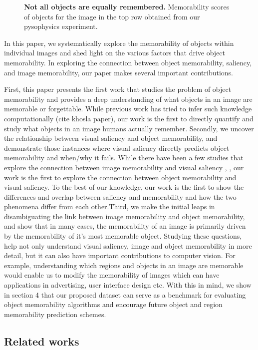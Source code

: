 \begin{figure}[t]
\centering
{}
\vspace{-5mm}\caption{\footnotesize\textbf{Not all objects are equally remembered.} Memorability scores of objects for the image in the top row obtained from our pysophysics experiment. }\label{fig:introPhoto}
\end{figure}

In this paper, we systematically explore the memorability of objects within individual images and shed light on the various factors that drive object memorability. In exploring the connection between object memorability, saliency, and image memorability, our paper makes several important contributions.

First, this paper presents the first work that studies the problem of object memorability and provides a deep understanding of what objects in an image are memorable or forgettable. While previous work has tried to infer such knowledge  computationally (cite khosla paper), our work is the first to directly quantify and study what objects in an image humans actually remember.  Secondly, we uncover the relationship between visual saliency and object memorability, and demonstrate those instances where visual saliency directly predicts object memorability and when/why it fails. While there have been a few studies that explore the connection between image memorability and visual saliency \cite{zoya15}, \cite{lemeur13}, our work is the first to explore the connection between object memorability and visual saliency. To the best of our knowledge, our work is the first to show the differences and overlap between saliency and memorability and how the two phenomena differ from each other.Third, we make the initial leaps in disambiguating the link between image memorability and object memorability, and show that in many cases, the memorability of an image is primarily driven by the memorability of it’s most memorable object. Studying these questions, help not only understand visual saliency, image and object memorability in more detail, but it can also have important contributions to computer vision. For example, understanding which regions and objects in an image are memorable would enable us to modify the memorability of images which can have applications in advertising, user interface design etc. With this in mind, we show in section 4 that our proposed dataset can serve as a benchmark for evaluating object memorability algorithms and encourage future object and region memorability prediction schemes.


\subsection{Related works}
 